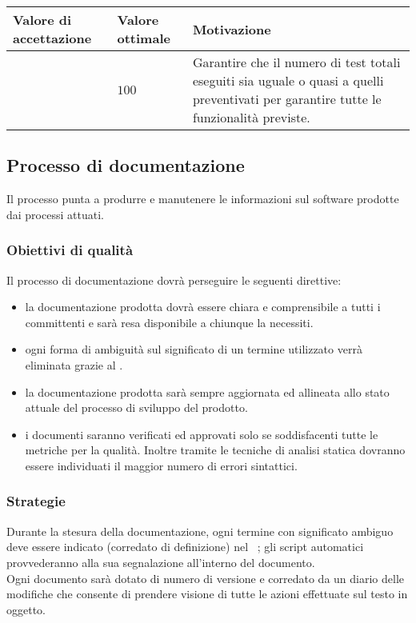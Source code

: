 \begin{center}
		\begin{tabular}{|P{2.5cm}|P{2.5cm}|P{6cm}|}
		\hline
			\textbf{Valore di accettazione}	& \textbf{Valore ottimale} & \textbf{Motivazione} \\
			\hline
			[$90 - 100$] & $100$ &	Garantire che il numero di test totali eseguiti sia uguale o quasi a quelli preventivati per garantire tutte le funzionalità previste. \\
			\hline
			\end{tabular}
\end{center}



\subsection{Processo di documentazione}

Il processo punta a produrre e manutenere le informazioni sul software prodotte dai processi attuati.
\subsubsection{Obiettivi di qualità}
Il processo di documentazione dovrà perseguire le seguenti direttive:
\begin{itemize}
\item la documentazione prodotta dovrà essere chiara e comprensibile a tutti i committenti e sarà resa disponibile a chiunque la necessiti.
\item ogni forma di ambiguità sul significato di un termine utilizzato verrà eliminata grazie al \glossario.
\item la documentazione prodotta sarà sempre aggiornata ed allineata allo stato attuale del processo di sviluppo del prodotto.
\item i documenti saranno verificati ed approvati solo se soddisfacenti tutte le metriche per la qualità. Inoltre tramite le tecniche di analisi statica dovranno essere individuati il maggior numero di errori sintattici.
\end{itemize}
\subsubsection{Strategie}
Durante la stesura della documentazione, ogni termine con significato ambiguo deve essere indicato (corredato di definizione) nel \glossario\ ; gli script automatici provvederanno alla sua segnalazione all'interno del documento.\\
Ogni documento sarà dotato di numero di versione e corredato da un diario delle modifiche che consente di prendere visione di tutte le azioni effettuate sul testo in oggetto.

